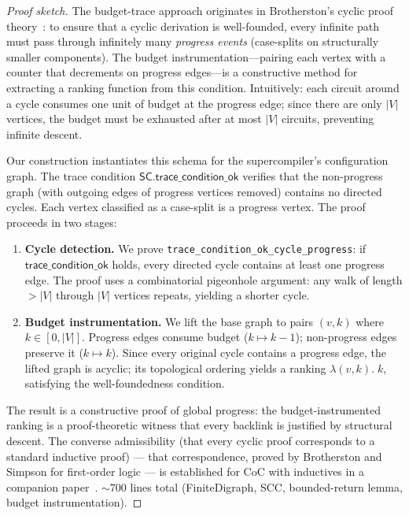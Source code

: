 \begin{proof}[Proof sketch]
The budget-trace approach originates in Brotherston's cyclic proof theory~\cite{brotherston-2006-cyclic}: to ensure that a cyclic derivation is well-founded, every infinite path must pass through infinitely many \emph{progress events} (case-splits on structurally smaller components). The budget instrumentation---pairing each vertex with a counter that decrements on progress edges---is a constructive method for extracting a ranking function from this condition. Intuitively: each circuit around a cycle consumes one unit of budget at the progress edge; since there are only $|V|$ vertices, the budget must be exhausted after at most $|V|$ circuits, preventing infinite descent.

Our construction instantiates this schema for the supercompiler's configuration graph. The trace condition $\mathsf{SC.trace\_condition\_ok}$ verifies that the non-progress graph (with outgoing edges of progress vertices removed) contains no directed cycles. Each vertex classified as a case-split is a progress vertex. The proof proceeds in two stages:
\begin{enumerate}[leftmargin=*]
\item \textbf{Cycle detection.} We prove \texttt{trace\_condition\_ok\_cycle\_progress}: if $\mathsf{trace\_condition\_ok}$ holds, every directed cycle contains at least one progress edge. The proof uses a combinatorial pigeonhole argument: any walk of length $>|V|$ through $|V|$ vertices repeats, yielding a shorter cycle.
\item \textbf{Budget instrumentation.} We lift the base graph to pairs $(v,k)$ where $k \in [0,|V|]$. Progress edges consume budget ($k \mapsto k-1$); non-progress edges preserve it ($k \mapsto k$). Since every original cycle contains a progress edge, the lifted graph is acyclic; its topological ordering yields a ranking $\lambda(v,k).\;k$, satisfying the well-foundedness condition.
\end{enumerate}
The result is a constructive proof of global progress: the budget-instrumented ranking is a proof-theoretic witness that every backlink is justified by structural descent. The converse admissibility (that every cyclic proof corresponds to a standard inductive proof) --- that correspondence, proved by Brotherston and Simpson for first-order logic --- is established for CoC with inductives in a companion paper~\cite{admissibility-2027}.
$\sim$700 lines total (FiniteDigraph, SCC, bounded-return lemma, budget instrumentation).
\end{proof}

